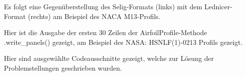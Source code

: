 \appendix

\label{appendix:a}

Es folgt eine Gegenüberstellung des Selig-Formats (links) mit dem Lednicer-Format (rechts) am Beispiel des NACA M13-Profils.

\begin{minipage}{0.45\textwidth}

\end{minipage}
    \hfill
\begin{minipage}{0.45\textwidth}

\end{minipage}

\newpage
{}
\label{appendix:b}
Hier ist die Ausgabe der ersten 30 Zeilen der AirfoilProfile-Methode .write\_panels() gezeigt, am Beispiel des NASA: HSNLF(1)-0213 Profils gezeigt.



\newpage
{}
\label{appendix:C}
Hier sind ausgewählte Codeausschnitte gezeigt, welche zur Lösung der Problemstellungen geschrieben wurden.
